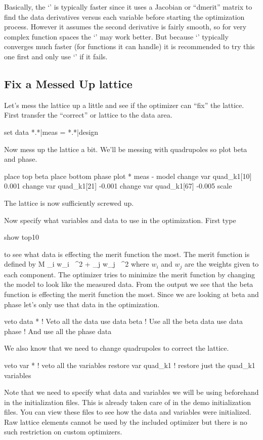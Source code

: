 Basically, the `' is typically faster since it uses a Jacobian
or ``dmerit'' matrix to find the data derivatives versus each variable
before starting the optimization process.  However it assumes the
second derivative is fairly smooth, so for very complex function
spaces the `' may work better. But because `' typically
converges much faster (for functions it can handle) it is recommended
to try this one first and only use `' if it fails.

\subsection{Fix a Messed Up lattice}
\label{ss:fix_it}

Let's mess the lattice up a little and see if the optimizer can
``fix'' the lattice. First transfer the ``correct'' or 
lattice to the  data area.
\begin{example}
  set data *.*|meas = *.*|design
\end{example}
Now mess up the lattice a bit. We'll be messing with quadrupoles so
plot beta and phase.
\begin{example}
  place top beta
  place bottom phase
  plot * meas - model
  change var quad\_k1[10] 0.001
  change var quad\_k1[21] -0.001
  change var quad\_k1[67] -0.005
  scale
\end{example}
The lattice is now sufficiently screwed up.

Now specify what variables and data to use in the optimization. First type
\begin{example}
  show top10
\end{example}
to see what data is effecting the merit function the most. The merit
function is defined by
\Begineq
  {\cal M} \equiv \sum_{i} w_i \,
    ^2 + 
  \sum_{j} w_j \,
    ^2
  \label{eq:merit}
\Endeq
where $w_{i}$ and $w_{j}$ are the weights given to each component.
The optimizer tries to minimize the merit function by changing the
model to look like the measured data. From the  output we
see that the beta function is effecting the merit function the
most. Since we are looking at beta and phase let's only use that data
in the optimization.
\begin{example}
  veto data *         ! Veto all the data
  use  data beta      ! Use all the beta data
  use  data phase     ! And use all the phase data
\end{example}
We also know that we need to change quadrupoles to correct the lattice.
\begin{example}
  veto var *           ! veto all the variables
  restore var quad\_k1 ! restore just the quad\_k1 variables
\end{example}
Note that we need to specify what data and variables we will be using
beforehand in the initialization files. This is already taken care of
in the demo initialization files. You can view these files to see how
the data and variables were initialized. Raw lattice elements cannot
be used by the included optimizer but there is no such restriction on
custom optimizers.

